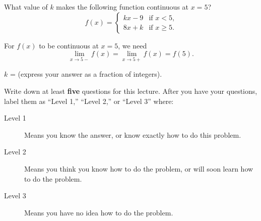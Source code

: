 \documentclass{ximera}
\begin{document}
\begin{question}
What value of $k$ makes the following function continuous at $x=5$?
\[
f(x) = 
\begin{cases} 
  kx-9 & \text{if $x< 5$,} \\ 
  8x+k   & \text{if $x\ge 5$.}
\end{cases}
\]
\begin{hint}
For $f(x)$ to be continuous at $x=5$, we need 
\[
\lim_{x\to5-}f(x) = \lim_{x\to 5+}f(x) = f(5).
\]
\end{hint}
\begin{prompt}
$k$ =  (express your answer as a fraction of integers).
\end{prompt}
\end{question}










Write down at least \textbf{five} questions for this lecture. After
you have your questions, label them as ``Level 1,'' ``Level 2,'' or
``Level 3'' where:
\begin{description}
\item[Level 1] Means you know the answer, or know exactly how to do this problem.
\item[Level 2] Means you think you know how to do the problem, or will soon learn how to do the problem.
\item[Level 3] Means you have no idea how to do the problem. 
\end{description}
\begin{question}
  \begin{freeResponse}
  \end{freeResponse}
\end{question}
\end{document}
